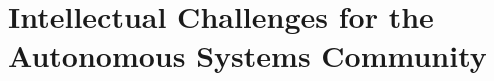 \documentclass[sigconf,nonacm]{acmart}%
\begin{document}
	
	\section{Intellectual Challenges for the Autonomous Systems Community}\label{as-challenges}
\end{document}

